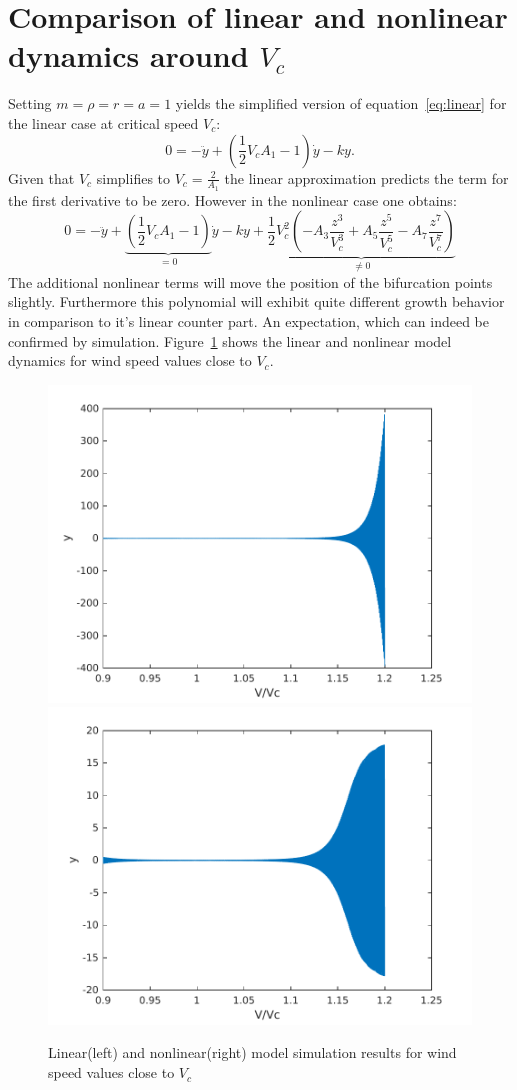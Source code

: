 \section{Comparison of linear and nonlinear dynamics around $V_c$}
Setting $m=\rho=r=a=1$ yields the simplified version of equation~\ref{eq:linear} for the linear case at critical speed $V_c$:
\begin{equation}
0 = -\ddot{y} + (\frac{1}{2}V_c A_1 - 1 )\dot{y} - ky.
\end{equation}
Given that $V_c$ simplifies to $V_c = \frac{2}{A_1}$ the linear approximation predicts the term for the first derivative to be zero. However in the nonlinear case one obtains:
\begin{equation}
0 = -\ddot{y} + 
\underbrace{(\frac{1}{2}V_c A_1 - 1 )}_\text{$=0$} \dot{y}  - ky 
+ \underbrace{\frac{1}{2} V_c^2 (- A_3 \frac{z^3}{V_c^3} + A_5 \frac{z^5}{V_c^5} - A_7 \frac{z^7}{V_c^7})}_\text{$\ne 0$}
\end{equation}
The additional nonlinear terms will move the position of the bifurcation points slightly. Furthermore this polynomial will exhibit quite different growth behavior in comparison to it's linear counter part. An expectation, which can indeed be confirmed by simulation. Figure~\ref{fig:linNonLinVcSim} shows the linear and nonlinear model dynamics for wind speed values close to $V_c$.
\begin{figure}
\centering
\includegraphics[width=0.4\linewidth]{./plots/linearVcSim.pdf}
\includegraphics[width=0.4\linewidth]{./plots/nonLinearVcSim.pdf}
\caption{Linear(left) and nonlinear(right) model simulation results for wind speed values close to $V_c$}
\label{fig:linNonLinVcSim}
\end{figure}

